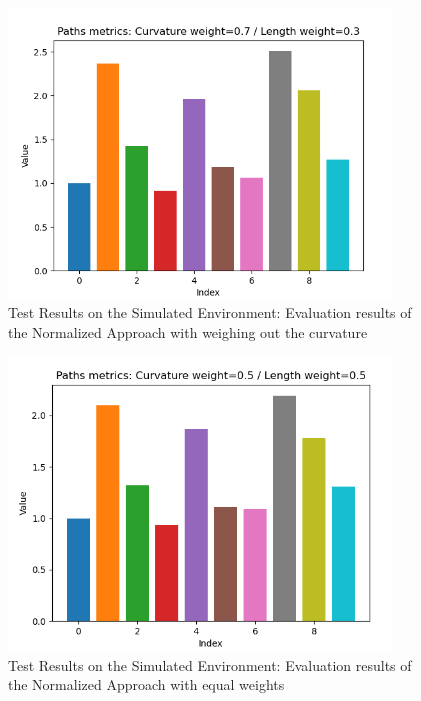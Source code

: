 \begin{figure}[H]
    \begin{center}
        \includegraphics[width=4in]{images/Chap2/w_0.7.png} %
        \caption{Test Results on the Simulated Environment: Evaluation results of the Normalized Approach
        with weighing out the curvature}
        \label{Test_Eval_Norm1}
        \end{center}    
\end{figure}
\begin{figure}[H]
    \begin{center}
        \includegraphics[width=4in]{images/Chap2/w_0.5.png} %
        \caption{Test Results on the Simulated Environment: Evaluation results of the Normalized Approach
        with equal weights}
        \label{Test_Eval_Norm2}
        \end{center}    
\end{figure}



